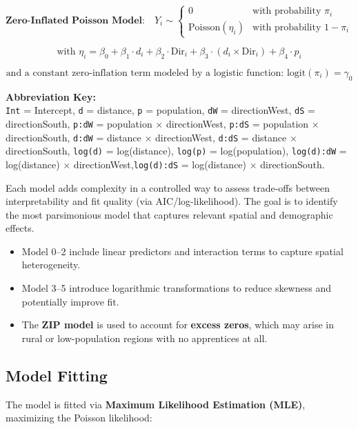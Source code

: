 \documentclass[
  12pt,
]{article}
\providecommand{\tightlist}{%
  \setlength{\itemsep}{0pt}\setlength{\parskip}{0pt}}
\begin{document}
\[
\textbf{Zero-Inflated Poisson Model:} \quad 
Y_i \sim \begin{cases}
0 & \text{with probability } \pi_i                                       \\
\text{Poisson}(\eta_i) & \text{with probability } 1 - \pi_i         
\end{cases}
\quad
\]

\[
\text{with }\eta_i = \beta_0 + \beta_1 \cdot d_i + \beta_2 \cdot \text{Dir}_i + \beta_3 \cdot (d_i \times \text{Dir}_i) + \beta_4 \cdot p_i
\]

\[ \text{and a constant zero-inflation term modeled by a logistic function: logit}(\pi_i) =\gamma_0\]

\textbf{Abbreviation Key:}\\
\texttt{Int} = Intercept, \texttt{d} = distance, \texttt{p} =
population, \texttt{dW} = directionWest, \texttt{dS} = directionSouth,
\texttt{p:dW} = population × directionWest, \texttt{p:dS} = population ×
directionSouth, \texttt{d:dW} = distance × directionWest, \texttt{d:dS}
= distance × directionSouth, \texttt{log(d)} = log(distance),
\texttt{log(p)} = log(population), \texttt{log(d):dW} = log(distance) ×
directionWest,\texttt{log(d):dS} = log(distance) × directionSouth.

Each model adds complexity in a controlled way to assess trade-offs
between interpretability and fit quality (via AIC/log-likelihood). The
goal is to identify the most parsimonious model that captures relevant
spatial and demographic effects.

\begin{itemize}
\tightlist
\item
  Model 0--2 include linear predictors and interaction terms to capture
  spatial heterogeneity.
\item
  Model 3--5 introduce logarithmic transformations to reduce skewness
  and potentially improve fit.
\item
  The \textbf{ZIP model} is used to account for \textbf{excess zeros},
  which may arise in rural or low-population regions with no apprentices
  at all.
\end{itemize}

\subsection{Model Fitting}\label{model-fitting}

The model is fitted via \textbf{Maximum Likelihood Estimation (MLE)},
maximizing the Poisson likelihood:
\end{document}
